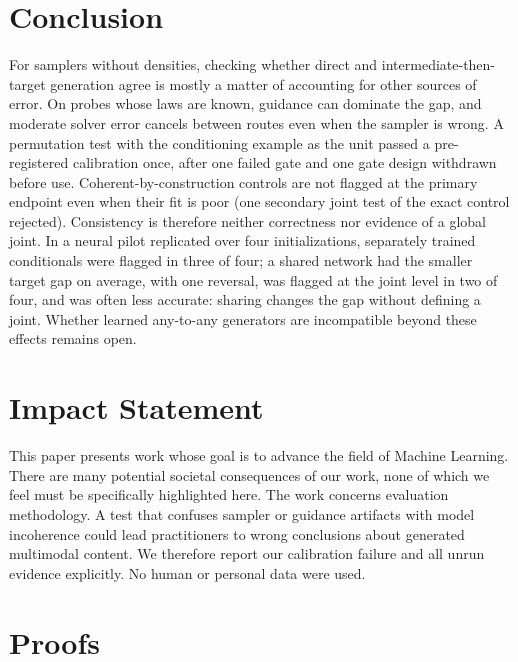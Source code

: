 \documentclass{article}
\theoremstyle{plain}
\theoremstyle{definition}
\theoremstyle{remark}
\begin{document}
\section{Conclusion}
\label{sec:conclusion}
For samplers without densities, checking whether direct and intermediate-then-target generation agree is mostly a matter of accounting for other sources of error.
On probes whose laws are known, guidance can dominate the gap, and moderate solver error cancels between routes even when the sampler is wrong.
A permutation test with the conditioning example as the unit passed a pre-registered calibration once, after one failed gate and one gate design withdrawn before use.
Coherent-by-construction controls are not flagged at the primary endpoint even when their fit is poor (one secondary joint test of the exact control rejected). Consistency is therefore neither correctness nor evidence of a global joint.
In a neural pilot replicated over four initializations, separately trained conditionals were flagged in three of four; a shared network had the smaller target gap on average, with one reversal, was flagged at the joint level in two of four, and was often less accurate: sharing changes the gap without defining a joint.
Whether learned any-to-any generators are incompatible beyond these effects remains open.\label{conc:end}

\section*{Impact Statement}
This paper presents work whose goal is to advance the field of Machine Learning. There are many potential societal consequences of our work, none of which we feel must be specifically highlighted here.
The work concerns evaluation methodology. A test that confuses sampler or guidance artifacts with model incoherence could lead practitioners to wrong conclusions about generated multimodal content. We therefore report our calibration failure and all unrun evidence explicitly.
No human or personal data were used.




\newpage
\appendix
\onecolumn

\section{Proofs}
\label{app:proofs}
\end{document}
